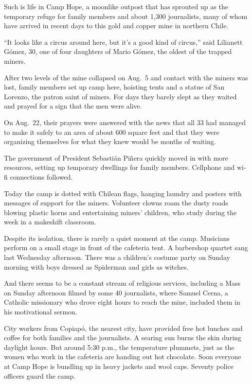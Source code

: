 ﻿\documentclass[12pt]{article}
\begin{document}
Such is life in Camp Hope, a moonlike outpost that has sprouted up as the temporary refuge for
family members and about 1,300 journalists, many of whom have arrived in recent days to this gold
and copper mine in northern Chile.

``It looks like a circus around here, but it's a good kind of circus,'' said Lilianett G\'omez, 30,
one of four daughters of Mario G\'omez, the oldest of the trapped miners.

After two levels of the mine collapsed on Aug.~5 and contact with the miners was lost, family
members set up camp here, hoisting tents and a statue of San Lorenzo, the patron saint of miners.
For days they barely slept as they waited and prayed for a sign that the men were alive.

On Aug.~22, their prayers were answered with the news that all 33 had managed to make it safely to
an area of about 600 square feet and that they were organizing themselves for what they knew would
be months of waiting.

The government of President Sebasti\'an Pi\~{n}era quickly moved in with more resources, setting up
temporary dwellings for family members. Cellphone and wi-fi connections followed.

Today the camp is dotted with Chilean flags, hanging laundry and posters with messages of support
for the miners. Volunteer clowns roam the dusty roads blowing plastic horns and entertaining miners'
children, who study during the week in a makeshift classroom.

Despite its isolation, there is rarely a quiet moment at the camp. Musicians perform on a small
stage in front of the cafeteria tent. A barbershop quartet sang last Wednesday afternoon. There was
a children's costume party on Sunday morning with boys dressed as Spiderman and girls as witches.

And there seems to be a constant stream of religious services, including a Mass on Sunday afternoon
filmed by some 40 journalists, where Samuel Cerna, a Catholic missionary who drove eight hours to
reach the mine, included them in his motivational sermon.

City workers from Copiap\'o, the nearest city, have provided free hot lunches and coffee for both
families and the journalists. A searing sun burns the skin during daylight hours. But around 5:30
p.m., the temperature plummets, just as the women who work in the cafeteria are handing out hot
chocolate. Soon everyone at Camp Hope is bundling up in heavy jackets and wool caps. Seventy police
officers guard the camp.
\end{document}

